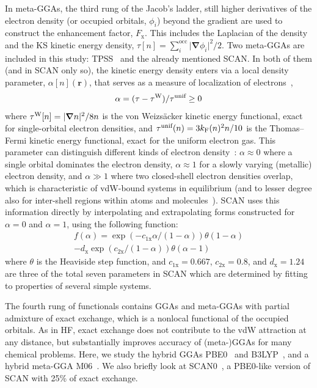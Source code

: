 In meta-GGAs, the third rung of the Jacob's ladder, still higher derivatives of the electron density (or occupied orbitals, $\phi_i$) beyond the gradient are used to construct the enhancement factor, $F_\mathrm x$.
This includes the Laplacian of the density and the KS kinetic energy density, $\tau[n]=\sum_i^\text{occ}\lvert\boldsymbol\nabla\phi_i\rvert^2/2$.
Two meta-GGAs are included in this study: TPSS~\cite{TaoPRL03} and the already mentioned SCAN\@.
In both of them (and in SCAN only so), the kinetic energy density enters via a local density parameter, $\alpha[n](\mathbf r)$, that serves as a measure of localization of electrons~\cite{BeckeJCP90},
\begin{equation}
  \alpha=(\tau-\tau^\text W)/\tau^\text{unif}\geq0
\end{equation}
where $\tau^\text W[n]=\lvert\boldsymbol\nabla n\rvert^2/8n$ is the von Weizsäcker kinetic energy functional, exact for single-orbital electron densities, and $\tau^\text{unif}(n)=3k_\text F(n)^2n/10$ is the Thomas--Fermi kinetic energy functional, exact for the uniform electron gas.
This parameter can distinguish different kinds of electron density~\cite{SunPRL13}: $\alpha\approx0$ where a single orbital dominates the electron density, $\alpha\approx1$ for a slowly varying (metallic) electron density, and $\alpha\gg1$ where two closed-shell electron densities overlap, which is characteristic of vdW-bound systems in equilibrium (and to lesser degree also for inter-shell regions within atoms and molecules~\cite{BeckeJCP90}).
SCAN uses this information directly by interpolating and extrapolating forms constructed for $\alpha=0$ and $\alpha=1$, using the following function:
\begin{multline}
  f(\alpha)=\exp(-c_\mathrm{1x}\alpha/(1-\alpha))\theta(1-\alpha)\\
  -d_\mathrm x\exp(c_\mathrm{2x}/(1-\alpha))\theta(\alpha-1)
  \label{eq:scan-interp}
\end{multline}
where $\theta$ is the Heaviside step function, and $c_\mathrm{1x}=0.667$, $c_\mathrm{2x}=0.8$, and $d_\mathrm x=1.24$ are three of the total seven parameters in SCAN which are determined by fitting to properties of several simple systems.

The fourth rung of functionals contains GGAs and meta-GGAs with partial admixture of exact exchange, which is a nonlocal functional of the occupied orbitals.
As in HF, exact exchange does not contribute to the vdW attraction at any distance, but substantially improves accuracy of (meta-)GGAs for many chemical problems. %
Here, we study the hybrid GGAs PBE0~\cite{PerdewJCP96,AdamoJCP99} and B3LYP~\cite{BeckeJCP93}, and a hybrid meta-GGA M06~\cite{ZhaoTCA08}.
We also briefly look at SCAN0~\cite{HuiJCP16}, a PBE0-like version of SCAN with 25\% of exact exchange.

